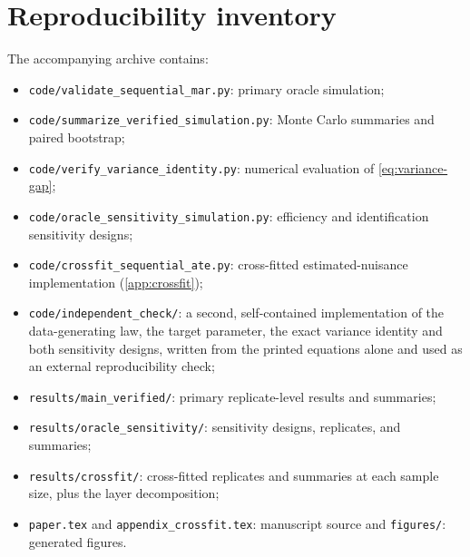 \documentclass[11pt]{article}
\theoremstyle{definition}
\newcommand{\1}{\mathbf{1}}
\begin{document}


\section{Reproducibility inventory}\label{app:inventory}

The accompanying archive contains:
\begin{itemize}[leftmargin=*]
\item \texttt{code/validate\_sequential\_mar.py}: primary oracle simulation;
\item \texttt{code/summarize\_verified\_simulation.py}: Monte Carlo summaries and paired bootstrap;
\item \texttt{code/verify\_variance\_identity.py}: numerical evaluation of \cref{eq:variance-gap};
\item \texttt{code/oracle\_sensitivity\_simulation.py}: efficiency and identification sensitivity designs;
\item \texttt{code/crossfit\_sequential\_ate.py}: cross-fitted estimated-nuisance implementation (\cref{app:crossfit});
\item \texttt{code/independent\_check/}: a second, self-contained implementation of the data-generating law, the target parameter, the exact variance identity and both sensitivity designs, written from the printed equations alone and used as an external reproducibility check;
\item \texttt{results/main\_verified/}: primary replicate-level results and summaries;
\item \texttt{results/oracle\_sensitivity/}: sensitivity designs, replicates, and summaries;
\item \texttt{results/crossfit/}: cross-fitted replicates and summaries at each sample size, plus the layer decomposition;
\item \texttt{paper.tex} and \texttt{appendix\_crossfit.tex}: manuscript source and \texttt{figures/}: generated figures.
\end{itemize}
\end{document}
